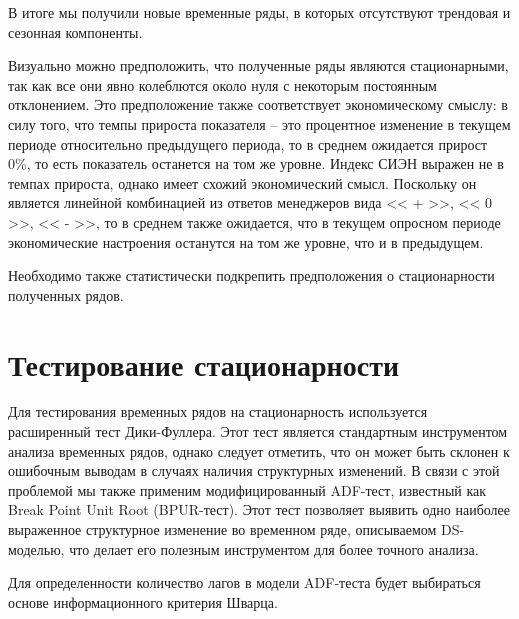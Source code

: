 \documentclass[a4paper, 14pt]{extreport}
\numberwithin{equation}{section}
\numberwithin{equation}{section}
\begin{document}
	
	
	В итоге мы получили новые временные ряды, в которых отсутствуют трендовая и сезонная компоненты. 
	
	Визуально можно предположить, что полученные ряды являются стационарными, так как все они явно колеблются около нуля с некоторым постоянным отклонением. Это предположение также соответствует экономическому смыслу: в силу того, что темпы прироста показателя -- это процентное изменение в текущем периоде относительно предыдущего периода, то в среднем ожидается прирост 0\%, то есть показатель останется на том же уровне. Индекс СИЭН выражен не в темпах прироста, однако имеет схожий экономический смысл. Поскольку он является линейной комбинацией из ответов менеджеров вида << + >>, << 0 >>, << - >>, то в среднем также ожидается, что в текущем опросном периоде экономические настроения останутся на том же уровне, что и в предыдущем.
	
	Необходимо также статистически подкрепить предположения о стационарности полученных рядов. 
	
	\section{Тестирование стационарности}
	Для тестирования временных рядов на стационарность используется расширенный тест Дики-Фуллера.
	Этот тест является стандартным инструментом анализа временных рядов, однако следует отметить, что он может быть склонен к ошибочным выводам в случаях наличия структурных изменений.
	В связи с этой проблемой мы также применим модифицированный ADF-тест, известный как Break Point Unit Root (BPUR-тест). Этот тест позволяет выявить одно наиболее выраженное структурное изменение во временном ряде, описываемом DS-моделью, что делает его полезным инструментом для более точного анализа.
	
	Для определенности количество лагов в модели ADF-теста будет выбираться основе информационного критерия Шварца.
	
\end{document}
